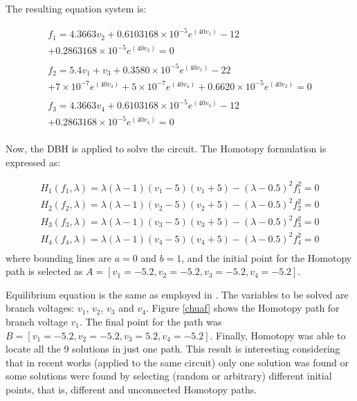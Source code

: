 \documentclass[journal,twocolumn]{IEEEtran}
\begin{document}
The resulting equation system is:

{\tiny
\begin{equation}
\begin{array}{l}
f_1=4.3663v_2+0.6103168 \times 10^{-5} e^{(40v_1)}-12 \\ +0.2863168\times 10^{-5}e^{(40v_2)}=0 \\ \\
f_2=5.4v_1+v_3+0.3580\times 10^{-5}e^{(40v_1)}-22 \\+7\times 10^{-7}e^{(40v_3)}+  5\times 10^{-7}e^{(40v_4)}+0.6620\times 10^{-5}e^{(40v_2)}=0 \\ \\
f_3=4.3663v_4+0.6103168\times 10^{-5}e^{(40v_3)}-12 \\ +0.2863168\times 10^{-5}e^{(40v_4)}=0 \\
\end{array}
\end{equation}
}

Now, the DBH is applied to solve the circuit. The Homotopy formulation is expressed as:

{\tiny
\begin{displaymath}
\begin{array}{c}
H_1(f_1,\lambda)=\lambda(\lambda-1)(v_1-5)(v_1+5)-(\lambda-0.5)^2 f_1^2=0\\
H_2(f_2,\lambda)=\lambda(\lambda-1)(v_2-5)(v_2+5)-(\lambda-0.5)^2 f_2^2=0\\
H_3(f_3,\lambda)=\lambda(\lambda-1)(v_3-5)(v_3+5)-(\lambda-0.5)^2 f_3^2=0\\
H_4(f_4,\lambda)=\lambda(\lambda-1)(v_4-5)(v_4+5)-(\lambda-0.5)^2 f_4^2=0\\
\end{array}
\end{displaymath}
}
where bounding lines are $a=0$ and $b=1$, and the initial point for the Homotopy path is selected as $A=[v_1=-5.2,v_2=-5.2,v_3=-5.2,v_4=-5.2]$.

Equilibrium equation is the same as employed in \cite{homo_chua}. The variables to be solved are branch voltages: $v_1$, $v_2$, $v_3$ and $v_4$. Figure \ref{chuaf} shows the Homotopy path for branch voltage $v_1$. The final point for the path was $B=[v_1=-5.2,v_2=-5.2,v_3=5.2,v_4=-5.2]$. Finally, Homotopy was able to locate all the 9 solutions in just one path. 
This result is interesting considering that in recent works \cite{homo_yamamura}\cite{homo_jaewook} (applied to the same circuit) only one solution was found or some solutions were found by selecting (random or arbitrary) different initial points, that is, different and unconnected Homotopy paths. 
\end{document}
